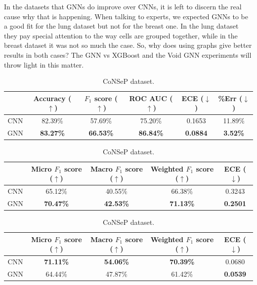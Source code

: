 In the datasets that GNNs do improve over CNNs, it is left to discern the real cause why that is happening. When talking to experts, we expected GNNs to be a good fit for the lung dataset but not for the breast one. In the lung dataset they pay special attention to the way cells are grouped together, while in the breast dataset it was not so much the case. So, why does using graphs give better results in both cases? The GNN vs XGBoost and the Void GNN experiments will throw light in this matter.

\begin{table}[ht]
\centering
\caption{Result of the GNN vs CNN experiment.}

\begin{tabular}{c|c|c|c|c|c|}
  \cline{2-6}
  & Accuracy ($\uparrow$) & $F_1$ score ($\uparrow$) & ROC AUC ($\uparrow$) & ECE ($\downarrow$) & \%Err ($\downarrow$) \\ \hline
\multicolumn{1}{|c|}{CNN}  & 82.39\% & 57.69\% & 75.20\% & 0.1653 & 11.89\% \\ \hline
\multicolumn{1}{|c|}{GNN}  & \textbf{83.27\%} & \textbf{66.53\%} & \textbf{86.84\%} & \textbf{0.0884} & \textbf{3.52\%} \\ \hline
\end{tabular}
\caption{DigiPatics lung dataset.}
\label{tab:gnn-cnn}

\vspace{0.5cm}

\begin{tabular}{c|c|c|c|c|}
  \cline{2-5}
  & Micro $F_1$ score ($\uparrow$) & Macro $F_1$ score ($\uparrow$) & Weighted $F_1$ score ($\uparrow$) & ECE ($\downarrow$) \\ \hline
\multicolumn{1}{|c|}{CNN}  & 65.12\% & 40.55\% & 66.38\% & 0.3243 \\ \hline
\multicolumn{1}{|c|}{GNN}  & \textbf{70.47\%} & \textbf{42.53\%} & \textbf{71.13\%} & \textbf{0.2501} \\ \hline
\end{tabular}
\caption{DigiPatics breast dataset.}

\vspace{0.5cm}

\begin{tabular}{c|c|c|c|c|}
  \cline{2-5}
  & Micro $F_1$ score ($\uparrow$) & Macro $F_1$ score ($\uparrow$) & Weighted $F_1$ score ($\uparrow$) & ECE ($\downarrow$) \\ \hline
\multicolumn{1}{|c|}{CNN}  & \textbf{71.11\%} & \textbf{54.06\%} & \textbf{70.39\%} & 0.0680 \\ \hline
\multicolumn{1}{|c|}{GNN}  & 64.44\% & 47.87\% & 61.42\% & \textbf{0.0539} \\ \hline
\end{tabular}
\caption{CoNSeP dataset.}


\end{table}
